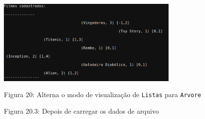 \documentclass[12pt,a4paper,portuguese]{article}
\begin{document}
\begin{figure}[H]
            \includegraphics[height=4.2cm]{imgs/lista_filmes_ARVORE_3.png}
            \vspace{-10px}
            \caption*{Figura 20.3: Depois de carregar os dados de arquivo}
            Figura 20: Alterna o modo de visualização de \texttt{Listas} para \texttt{Arvore}
        \end{figure}
\end{document}
